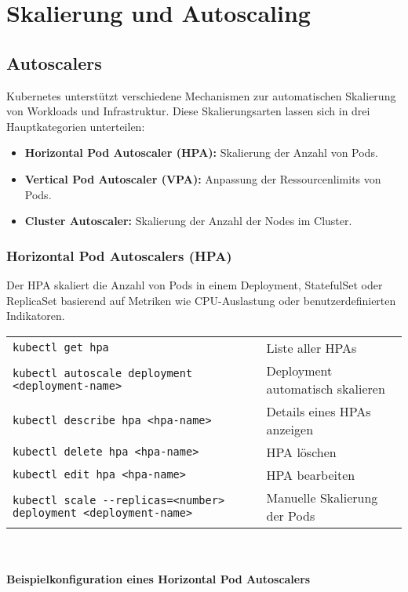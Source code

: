 \chapter{Skalierung und Autoscaling}

\section{Autoscalers}
Kubernetes unterstützt verschiedene Mechanismen zur automatischen Skalierung von Workloads und Infrastruktur. Diese Skalierungsarten lassen sich in drei Hauptkategorien unterteilen:
\begin{itemize}
    \item \textbf{Horizontal Pod Autoscaler (HPA):} Skalierung der Anzahl von Pods.
    \item \textbf{Vertical Pod Autoscaler (VPA):} Anpassung der Ressourcenlimits von Pods.
    \item \textbf{Cluster Autoscaler:} Skalierung der Anzahl der Nodes im Cluster.
\end{itemize}


\subsection{Horizontal Pod Autoscalers (HPA)}
Der HPA skaliert die Anzahl von Pods in einem Deployment, StatefulSet oder ReplicaSet basierend auf Metriken wie CPU-Auslastung oder benutzerdefinierten Indikatoren. \\

\noindent
\begin{tabular}{|p{}|p{}|}
\hline
\texttt{kubectl get hpa} & Liste aller HPAs \\
\texttt{kubectl autoscale deployment <deployment-name>} & Deployment automatisch skalieren \\
\texttt{kubectl describe hpa <hpa-name>} & Details eines HPAs anzeigen \\
\texttt{kubectl delete hpa <hpa-name>} & HPA löschen \\
\texttt{kubectl edit hpa <hpa-name>} & HPA bearbeiten \\
\texttt{kubectl scale {-}{-}replicas=<number> deployment <deployment-name>} & Manuelle Skalierung der Pods \\
\hline
\end{tabular}
\phantom{.}\\
\noindent
\subsubsection{Beispielkonfiguration eines Horizontal Pod Autoscalers}

\newpage
